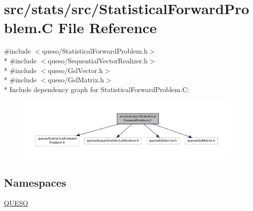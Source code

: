 \hypertarget{_statistical_forward_problem_8_c}{\section{src/stats/src/\-Statistical\-Forward\-Problem.C File Reference}
\label{_statistical_forward_problem_8_c}
}
{\ttfamily \#include $<$queso/\-Statistical\-Forward\-Problem.\-h$>$}\\*
{\ttfamily \#include $<$queso/\-Sequential\-Vector\-Realizer.\-h$>$}\\*
{\ttfamily \#include $<$queso/\-Gsl\-Vector.\-h$>$}\\*
{\ttfamily \#include $<$queso/\-Gsl\-Matrix.\-h$>$}\\*
Include dependency graph for Statistical\-Forward\-Problem.\-C\-:
\nopagebreak
\begin{figure}[H]
\begin{center}
\leavevmode
\includegraphics[width=350pt]{_statistical_forward_problem_8_c__incl}
\end{center}
\end{figure}
\subsection*{Namespaces}
\begin{DoxyCompactItemize}
\item 
\hyperlink{namespace_q_u_e_s_o}{Q\-U\-E\-S\-O}
\end{DoxyCompactItemize}
